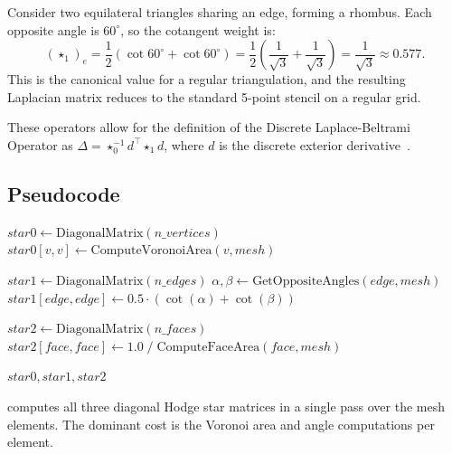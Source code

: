 \begin{example}\label{ex:cotangent_weight}
Consider two equilateral triangles sharing an edge, forming a rhombus. Each opposite angle is $60^\circ$, so the cotangent weight is:
\[
(\star_1)_e = \frac{1}{2}(\cot 60^\circ + \cot 60^\circ) = \frac{1}{2}\left(\frac{1}{\sqrt{3}} + \frac{1}{\sqrt{3}}\right) = \frac{1}{\sqrt{3}} \approx 0.577.
\]
This is the canonical value for a regular triangulation, and the resulting Laplacian matrix reduces to the standard 5-point stencil on a regular grid.
\end{example}

These operators allow for the definition of the Discrete Laplace-Beltrami Operator as $\Delta = \star_0^{-1} d^\top \star_1 d$, where $d$ is the discrete exterior derivative~\cite{crane2013}.

\subsection{Pseudocode}
\begin{algorithm}
\caption{Compute Hodge Star Operators}\label{alg:compute_hodge_stars}
\begin{algorithmic}
    \State $star0 \gets \text{DiagonalMatrix}(n\_vertices)$
        \State $star0[v, v] \gets \text{ComputeVoronoiArea}(v, mesh)$
    \EndFor

    \State $star1 \gets \text{DiagonalMatrix}(n\_edges)$
        \State $\alpha, \beta \gets \text{GetOppositeAngles}(edge, mesh)$
        \State $star1[edge, edge] \gets 0.5 \cdot (\cot(\alpha) + \cot(\beta))$
    \EndFor

    \State $star2 \gets \text{DiagonalMatrix}(n\_faces)$
        \State $star2[face, face] \gets 1.0 \;/\; \text{ComputeFaceArea}(face, mesh)$
    \EndFor

    \Return $star0, star1, star2$
\EndFunction
\end{algorithmic}
\end{algorithm}
 computes all three diagonal Hodge star matrices in a single pass over the mesh elements. The dominant cost is the Voronoi area and angle computations per element.

